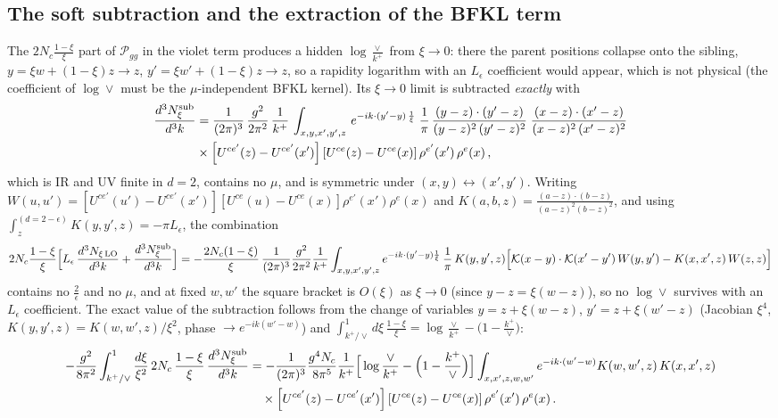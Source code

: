 \documentclass[9pt]{article}
\numberwithin{equation}{section}
\begin{document}
\subsection{The soft subtraction and the extraction of the BFKL term}
The $2N_{c}\frac{1-\xi}{\xi}$ part of $\mathcal{P}_{gg}$ in the violet term produces a hidden
$\log\frac{\vee}{k^{+}}$ from $\xi\to0$: there the parent positions collapse onto the sibling,
$y=\xi w+(1-\xi)z\to z$, $y'=\xi w'+(1-\xi)z\to z$, so a rapidity logarithm with an $L_{\epsilon}$
coefficient would appear, which is not physical (the coefficient of $\log\vee$ must be the
$\mu$-independent BFKL kernel). Its $\xi\to0$ limit is subtracted \emph{exactly} with
\begin{align}
\frac{d^{3}N^{\rm sub}_{\xi}}{d^{3}k} & = \frac{1}{(2\pi)^{3}}\, \frac{g^{2}}{2\pi^{2}}\, \frac{1}{k^{+}}\,\int_{x,y,x',y',z}\, e^{-ik\cdot (y'-y)\,\frac{1}{\xi}}\;\frac{1}{\pi}\,\frac{(y-z)\cdot (y'-z)}{(y-z)^{2}\,(y'-z)^{2}}\;\frac{(x-z)\cdot (x'-z)}{(x-z)^{2}\,(x'-z)^{2}}\notag\\
&\times\left[U^{ce'}(z) - U^{ce'}(x')\right]\left[U^{ce}(z) - U^{ce}(x)\right]\rho^{e'}(x')\,\rho^{e}(x)\,,
\end{align}
which is IR and UV finite in $d=2$, contains no $\mu$, and is symmetric under
$(x,y)\leftrightarrow(x',y')$. Writing $W(u,u')=[U^{ce'}(u')-U^{ce'}(x')][U^{ce}(u)-U^{ce}(x)]\rho^{e'}(x')\rho^{e}(x)$
and $K(a,b,z)=\frac{(a-z)\cdot(b-z)}{(a-z)^{2}(b-z)^{2}}$, and using
$\int_{z}^{(d=2-\epsilon)}K(y,y',z)=-\pi L_{\epsilon}$, the combination
\begin{align}
2N_c\frac{1-\xi}{\xi}\Big[L_\epsilon\,\frac{d^{3}N_{\xi\,\rm LO}}{d^{3}k}+\frac{d^{3}N^{\rm sub}_{\xi}}{d^{3}k}\Big]
=-\frac{2N_c(1-\xi)}{\xi}\,\frac{1}{(2\pi)^{3}}\frac{g^{2}}{2\pi^{2}}\frac{1}{k^{+}}
\int_{x,y,x',y',z}e^{-ik\cdot(y'-y)\frac1\xi}\,\frac1\pi\,K(y,y',z)\Big[\mathcal K(x-y)\cdot\mathcal K(x'-y')\,W(y,y')-K(x,x',z)\,W(z,z)\Big]
\end{align}
contains no $\frac{2}{\epsilon}$ and no $\mu$, and at fixed $w,w'$ the square bracket is
$O(\xi)$ as $\xi\to0$ (since $y-z=\xi(w-z)$), so no $\log\vee$ survives with an $L_{\epsilon}$
coefficient. The exact value of the subtraction follows from the change of variables
$y=z+\xi(w-z)$, $y'=z+\xi(w'-z)$ (Jacobian $\xi^{4}$, $K(y,y',z)=K(w,w',z)/\xi^{2}$, phase
$\to e^{-ik(w'-w)}$) and $\int_{k^{+}/\vee}^{1}d\xi\,\frac{1-\xi}{\xi}=\log\frac{\vee}{k^{+}}-\big(1-\frac{k^{+}}{\vee}\big)$:
\begin{align}\label{eq:subvalue}
-\frac{g^{2}}{8\pi^{2}}\int_{k^+/\vee}^{1}\frac{d\xi}{\xi^{2}}\,2N_c\,\frac{1-\xi}{\xi}\,\frac{d^{3}N^{\rm sub}_{\xi}}{d^{3}k} &=-\frac{1}{(2\pi)^{3}}\frac{g^{4}N_{c}}{8\pi^{5}}\frac{1}{k^{+}}\Big[\log\frac{\vee}{k^{+}}-\Big(1-\frac{k^{+}}{\vee}\Big)\Big]\int_{x,x',z,w,w'}e^{-ik\cdot(w'-w)}K(w,w',z)\,K(x,x',z)\notag\\
&\quad\times\left[U^{ce'}(z) - U^{ce'}(x')\right]\left[U^{ce}(z) - U^{ce}(x)\right]\rho^{e'}(x')\,\rho^{e}(x)\,.
\end{align}
\end{document}
